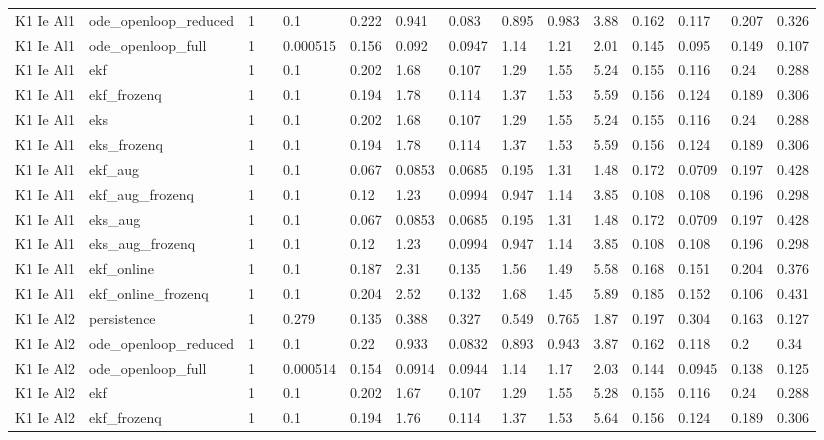 \begin{table}[t]
\begin{tabular}{lllllllllllllll}
K1 Ie Al1 & ode\_openloop\_reduced & 1 &  & 0.1 & 0.222 & 0.941 & 0.083 & 0.895 & 0.983 & 3.88 & 0.162 & 0.117 & 0.207 & 0.326 \\
K1 Ie Al1 & ode\_openloop\_full & 1 &  & 0.000515 & 0.156 & 0.092 & 0.0947 & 1.14 & 1.21 & 2.01 & 0.145 & 0.095 & 0.149 & 0.107 \\
K1 Ie Al1 & ekf & 1 &  & 0.1 & 0.202 & 1.68 & 0.107 & 1.29 & 1.55 & 5.24 & 0.155 & 0.116 & 0.24 & 0.288 \\
K1 Ie Al1 & ekf\_frozenq & 1 &  & 0.1 & 0.194 & 1.78 & 0.114 & 1.37 & 1.53 & 5.59 & 0.156 & 0.124 & 0.189 & 0.306 \\
K1 Ie Al1 & eks & 1 &  & 0.1 & 0.202 & 1.68 & 0.107 & 1.29 & 1.55 & 5.24 & 0.155 & 0.116 & 0.24 & 0.288 \\
K1 Ie Al1 & eks\_frozenq & 1 &  & 0.1 & 0.194 & 1.78 & 0.114 & 1.37 & 1.53 & 5.59 & 0.156 & 0.124 & 0.189 & 0.306 \\
K1 Ie Al1 & ekf\_aug & 1 &  & 0.1 & 0.067 & 0.0853 & 0.0685 & 0.195 & 1.31 & 1.48 & 0.172 & 0.0709 & 0.197 & 0.428 \\
K1 Ie Al1 & ekf\_aug\_frozenq & 1 &  & 0.1 & 0.12 & 1.23 & 0.0994 & 0.947 & 1.14 & 3.85 & 0.108 & 0.108 & 0.196 & 0.298 \\
K1 Ie Al1 & eks\_aug & 1 &  & 0.1 & 0.067 & 0.0853 & 0.0685 & 0.195 & 1.31 & 1.48 & 0.172 & 0.0709 & 0.197 & 0.428 \\
K1 Ie Al1 & eks\_aug\_frozenq & 1 &  & 0.1 & 0.12 & 1.23 & 0.0994 & 0.947 & 1.14 & 3.85 & 0.108 & 0.108 & 0.196 & 0.298 \\
K1 Ie Al1 & ekf\_online & 1 &  & 0.1 & 0.187 & 2.31 & 0.135 & 1.56 & 1.49 & 5.58 & 0.168 & 0.151 & 0.204 & 0.376 \\
K1 Ie Al1 & ekf\_online\_frozenq & 1 &  & 0.1 & 0.204 & 2.52 & 0.132 & 1.68 & 1.45 & 5.89 & 0.185 & 0.152 & 0.106 & 0.431 \\
K1 Ie Al2 & persistence & 1 &  & 0.279 & 0.135 & 0.388 & 0.327 & 0.549 & 0.765 & 1.87 & 0.197 & 0.304 & 0.163 & 0.127 \\
K1 Ie Al2 & ode\_openloop\_reduced & 1 &  & 0.1 & 0.22 & 0.933 & 0.0832 & 0.893 & 0.943 & 3.87 & 0.162 & 0.118 & 0.2 & 0.34 \\
K1 Ie Al2 & ode\_openloop\_full & 1 &  & 0.000514 & 0.154 & 0.0914 & 0.0944 & 1.14 & 1.17 & 2.03 & 0.144 & 0.0945 & 0.138 & 0.125 \\
K1 Ie Al2 & ekf & 1 &  & 0.1 & 0.202 & 1.67 & 0.107 & 1.29 & 1.55 & 5.28 & 0.155 & 0.116 & 0.24 & 0.288 \\
K1 Ie Al2 & ekf\_frozenq & 1 &  & 0.1 & 0.194 & 1.76 & 0.114 & 1.37 & 1.53 & 5.64 & 0.156 & 0.124 & 0.189 & 0.306 \\

\end{tabular}
\end{table}
